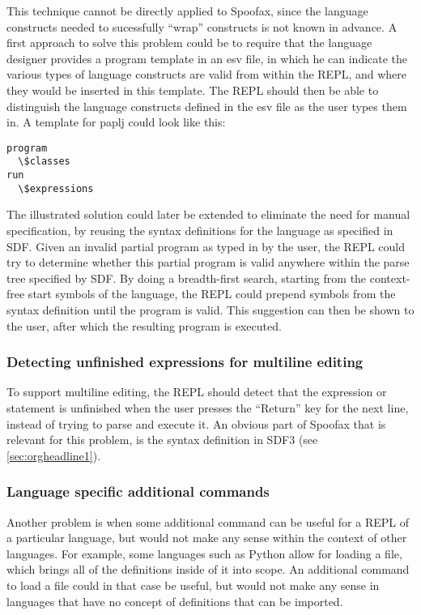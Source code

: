This technique cannot be directly applied to Spoofax, since the language
constructs needed to sucessfully ``wrap'' constructs is not known in advance.
A first approach to solve this problem could be to require that the language
designer provides a program template in an esv file, in which he can indicate
the various types of language constructs are valid from within the REPL, and
where they would be inserted in this template.
The REPL should then be able to distinguish the language constructs defined in the esv file
as the user types them in.
A template for paplj could look like this:
\begin{lstlisting}
program
  \$classes
run
  \$expressions
\end{lstlisting}

The illustrated solution could later be extended to eliminate the need for manual specification,
by reusing the syntax definitions for the language as specified in SDF.
Given an invalid partial program as typed in by the user, the REPL could try to determine
whether this partial program is valid anywhere within the parse tree specified by SDF.
By doing a breadth-first search, starting from the context-free start symbols of the language,
the REPL could prepend symbols from the syntax definition until the program is valid.
This suggestion can then be shown to the user, after which the resulting program is executed.

\subsubsection{Detecting unfinished expressions for multiline editing}
\label{sec:detect-unfin-expr}
To support multiline editing, the REPL should detect that the
expression or statement is unfinished when the user presses the
``Return'' key for the next line, instead of trying to parse and
execute it. An obvious part of Spoofax that is relevant for this
problem, is the syntax definition in SDF3 (see
\cref{sec:orgheadline1}).

\subsubsection{Language specific additional commands}
\label{sec:lang-spec-addit}
Another problem is when some additional command can be useful for a
REPL of a particular language, but would not make any sense within the
context of other languages. For example, some languages such as Python
allow for loading a file, which brings all of the definitions inside
of it into scope. An additional command to load a file could in that
case be useful, but would not make any sense in languages that have no
concept of definitions that can be imported.

